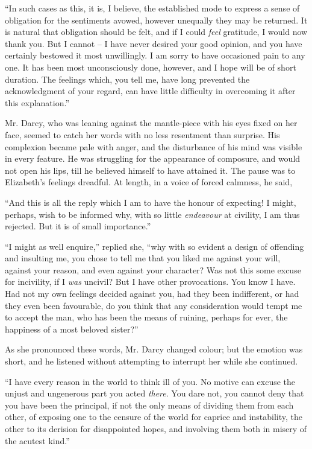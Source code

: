 “In such cases as this, it is, I believe, the established
mode to express a sense of obligation for the sentiments
avowed, however unequally they may be returned. It is
natural that obligation should be felt, and if I could \textit{feel}
gratitude, I would now thank you. But I cannot -- I have
never desired your good opinion, and you have certainly
bestowed it most unwillingly. I am sorry to have occasioned
pain to any one. It has been most unconsciously
done, however, and I hope will be of short duration.
The feelings which, you tell me, have long prevented the
acknowledgment of your regard, can have little difficulty
in overcoming it after this explanation.”

Mr. Darcy, who was leaning against the mantle-piece
with his eyes fixed on her face, seemed to catch her words
with no less resentment than surprise. His complexion
became pale with anger, and the disturbance of his mind
was visible in every feature. He was struggling for the
appearance of composure, and would not open his lips,
till he believed himself to have attained it. The pause
was to Elizabeth’s feelings dreadful. At length, in a voice
of forced calmness, he said,

“And this is all the reply which I am to have the
honour of expecting! I might, perhaps, wish to be informed
why, with so little \textit{endeavour} at civility, I am thus
rejected. But it is of small importance.”

“I might as well enquire,” replied she, “why with so
evident a design of offending and insulting me, you chose
to tell me that you liked me against your will, against
your reason, and even against your character? Was not
this some excuse for incivility, if I \textit{was} uncivil? But I have
other provocations. You know I have. Had not my own
feelings decided against you, had they been indifferent,
or had they even been favourable, do you think that any
consideration would tempt me to accept the man, who has
been the means of ruining, perhaps for ever, the happiness
of a most beloved sister?”

As she pronounced these words, Mr. Darcy changed
colour; but the emotion was short, and he listened
without attempting to interrupt her while she continued.

“I have every reason in the world to think ill of you.
No motive can excuse the unjust and ungenerous part
you acted \textit{there}. You dare not, you cannot deny that you
have been the principal, if not the only means of dividing
them from each other, of exposing one to the censure of
the world for caprice and instability, the other to its
derision for disappointed hopes, and involving them both
in misery of the acutest kind.”

